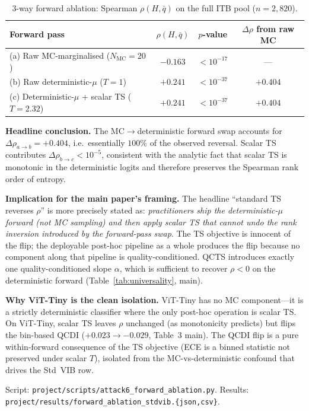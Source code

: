 \documentclass{bmvc2k}
\begin{document}
\begin{table}[h]
\centering
\caption{3-way forward ablation: Spearman $\rho(H,\bar q)$ on the full ITB pool ($n{=}2{,}820$).}
\label{tab:forward_ablation}
\footnotesize
\begin{tabular}{lccc}
\toprule
Forward pass & $\rho(H,\bar q)$ & $p$-value & $\Delta\rho$ from raw MC \\
\midrule
(a) Raw MC-marginalised ($N_\text{MC}{=}20$) & $-0.163$ & $<10^{-17}$ & --- \\
(b) Raw deterministic-$\mu$ ($T{=}1$)        & $+0.241$ & $<10^{-37}$ & $+0.404$ \\
(c) Deterministic-$\mu$ + scalar TS ($T{=}2.32$) & $+0.241$ & $<10^{-37}$ & $+0.404$ \\
\bottomrule
\end{tabular}
\end{table}

\textbf{Headline conclusion.} The MC$\to$deterministic forward swap accounts for $\Delta\rho_{a\to b}{=}+0.404$, i.e.\ essentially $100\%$ of the observed reversal. Scalar TS contributes $\Delta\rho_{b\to c}{<}10^{-5}$, consistent with the analytic fact that scalar TS is monotonic in the deterministic logits and therefore preserves the Spearman rank order of entropy.

\textbf{Implication for the main paper's framing.} The headline ``standard TS reverses $\rho$'' is more precisely stated as: \emph{practitioners ship the deterministic-$\mu$ forward (not MC sampling) and then apply scalar TS that cannot undo the rank inversion introduced by the forward-pass swap}. The TS objective is innocent of the flip; the deployable post-hoc pipeline as a whole produces the flip because no component along that pipeline is quality-conditioned. QCTS introduces exactly one quality-conditioned slope $\alpha$, which is sufficient to recover $\rho{<}0$ on the deterministic forward (Table~\ref{tab:universality}, main).

\textbf{Why ViT-Tiny is the clean isolation.} ViT-Tiny has no MC component---it is a strictly deterministic classifier where the only post-hoc operation is scalar TS. On ViT-Tiny, scalar TS leaves $\rho$ unchanged (as monotonicity predicts) but flips the bin-based QCDI ($+0.023\to-0.029$, Table~3 main). The QCDI flip is a pure within-forward consequence of the TS objective (ECE is a binned statistic not preserved under scalar $T$), isolated from the MC-vs-deterministic confound that drives the Std~VIB row.

Script: \texttt{project/scripts/attack6\_forward\_ablation.py}.
Results: \texttt{project/results/forward\_ablation\_stdvib.\{json,csv\}}.
\end{document}
